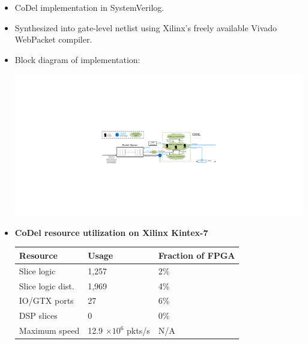 {\begin{multicols}{2}
\begin{itemize}
\item CoDel implementation in SystemVerilog.
\item Synthesized into gate-level netlist using Xilinx's freely available Vivado WebPacket compiler.
\item Block diagram of implementation:
\\
\begin{center}
\includegraphics[width=\columnwidth]{codel.pdf}
\end{center}
\item \textbf{CoDel resource utilization on Xilinx Kintex-7}\\
\begin{center}
\begin{tabular}{|l|l|l|}
\hline
\bf Resource & \bf Usage & \bf Fraction of FPGA \\
\hline Slice logic & 1,257 & 2\% \\
\hline Slice logic dist. & 1,969 & 4\% \\
\hline IO/GTX ports & 27 & 6\% \\
\hline DSP slices & 0 & 0\% \\
\hline Maximum speed & 12.9 $\times 10^6$ pkts/s & N/A \\
\hline
\end{tabular}
\end{center}

\end{itemize}


\end{multicols}}
